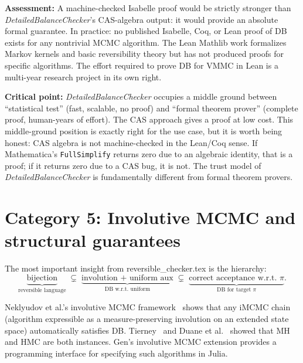 \documentclass[11pt,a4paper]{article}
\newcommand{\DBC}{\textit{DetailedBalanceChecker}}
\begin{document}
\textbf{Assessment:}  A machine-checked Isabelle proof would be strictly stronger
than \DBC{}'s CAS-algebra output: it would provide an absolute formal guarantee.
In practice: no published Isabelle, Coq, or Lean proof of DB exists for any
nontrivial MCMC algorithm.  The Lean Mathlib work formalizes Markov kernels and
basic reversibility theory but has not produced proofs for specific algorithms.
The effort required to prove DB for VMMC in Lean is a multi-year research project
in its own right.

\textbf{Critical point:}  \DBC{} occupies a middle ground between ``statistical
test'' (fast, scalable, no proof) and ``formal theorem prover'' (complete proof,
human-years of effort).  The CAS approach gives a proof at low cost.  This
middle-ground position is exactly right for the use case, but it is worth being
honest: CAS algebra is not machine-checked in the Lean/Coq sense.  If Mathematica's
\texttt{FullSimplify} returns zero due to an algebraic identity, that is a
proof; if it returns zero due to a CAS bug, it is not.  The trust model of \DBC{}
is fundamentally different from formal theorem provers.

\section{Category 5: Involutive MCMC and structural guarantees}
\label{sec:involutive}

The most important insight from reversible\_checker.tex is the hierarchy:
\[
  \underbrace{\text{bijection}}_{\text{reversible language}} \;\subsetneq\;
  \underbrace{\text{involution + uniform aux}}_{\text{DB w.r.t.\ uniform}} \;\subsetneq\;
  \underbrace{\text{correct acceptance w.r.t.\ }\pi}_{\text{DB for target }\pi}.
\]

Neklyudov et al.'s involutive MCMC framework~\cite{Neklyudov2020} shows that
any iMCMC chain (algorithm expressible as a measure-preserving involution on an
extended state space) automatically satisfies DB.  Tierney~\cite{Tierney1998} and
Duane et al.~\cite{Duane1987} showed that MH and HMC are both instances.
Gen's involutive MCMC extension provides a programming interface for specifying
such algorithms in Julia.
\end{document}

